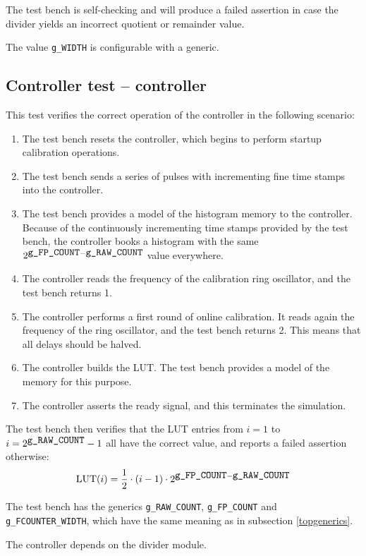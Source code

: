 \documentclass[a4paper,11pt]{article}
\begin{document}
The test bench is self-checking and will produce a failed assertion in case the divider yields an incorrect quotient or remainder value.

The value \verb!g_WIDTH! is configurable with a generic.

\subsection{Controller test -- controller}
This test verifies the correct operation of the controller in the following scenario:
\begin{enumerate}
\item The test bench resets the controller, which begins to perform startup calibration operations.
\item The test bench sends a series of pulses with incrementing fine time stamps into the controller.
\item The test bench provides a model of the histogram memory to the controller. Because of the continuously incrementing time stamps provided by the test bench, the controller books a histogram with the same $2^{\verb!g_FP_COUNT!-\verb!g_RAW_COUNT!}$ value everywhere.
\item The controller reads the frequency of the calibration ring oscillator, and the test bench returns 1.
\item The controller performs a first round of online calibration. It reads again the frequency of the ring oscillator, and the test bench returns 2. This means that all delays should be halved.
\item The controller builds the LUT. The test bench provides a model of the memory for this purpose.
\item The controller asserts the ready signal, and this terminates the simulation.
\end{enumerate}

The test bench then verifies that the LUT entries from $i = 1$ to $i = 2^{\verb!g_RAW_COUNT!}-1$ all have the correct value, and reports a failed assertion otherwise:
\begin{equation}
\textrm{LUT}(i) = \frac{1}{2}\cdot(i-1)\cdot2^{\verb!g_FP_COUNT!-\verb!g_RAW_COUNT!}
\end{equation}

The test bench has the generics \verb!g_RAW_COUNT!, \verb!g_FP_COUNT! and \verb!g_FCOUNTER_WIDTH!, which have the same meaning as in subsection \ref{topgenerics}.

The controller depends on the divider module.
\end{document}
